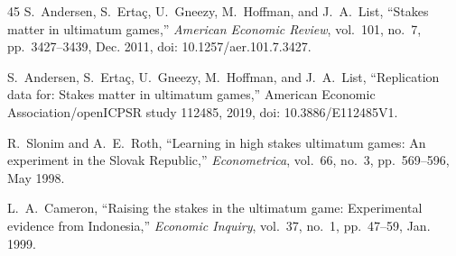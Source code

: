 \documentclass[journal]{IEEEtran}
\begin{document}
\begin{thebibliography}{45}
S.~Andersen, S.~Erta\c{c}, U.~Gneezy, M.~Hoffman, and J.~A.~List, ``Stakes matter in ultimatum games,''
\emph{American Economic Review}, vol.~101, no.~7, pp.~3427--3439, Dec. 2011, doi: 10.1257/aer.101.7.3427.

S.~Andersen, S.~Erta\c{c}, U.~Gneezy, M.~Hoffman, and J.~A.~List, ``Replication data for: Stakes matter in ultimatum games,''
American Economic Association/openICPSR study 112485, 2019, doi: 10.3886/E112485V1.

R.~Slonim and A.~E.~Roth, ``Learning in high stakes ultimatum games: An experiment in the Slovak Republic,''
\emph{Econometrica}, vol.~66, no.~3, pp.~569--596, May 1998.

L.~A.~Cameron, ``Raising the stakes in the ultimatum game: Experimental evidence from Indonesia,''
\emph{Economic Inquiry}, vol.~37, no.~1, pp.~47--59, Jan. 1999.

\end{thebibliography}

\balance
\end{document}

